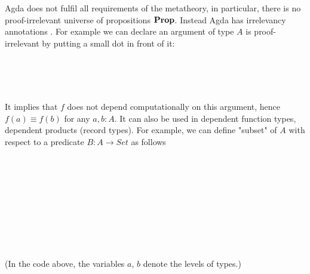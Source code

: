 Agda does not fulfil all requirements of the metatheory, in particular, there is no proof-irrelevant universe of propositions $\operatorname{\mathbf{Prop}}$. 
Instead Agda has irrelevancy annotations \cite{prAgda}. For example we can declare an argument of type $A$ is proof-irrelevant by putting a small dot in front of it: 


\begin{code}\>\<%
\\
\> \AgdaSymbol{:}   \<%
\\
\>  \AgdaSymbol{=} \<%
\\
\end{code}

It implies that $f$ does not depend computationally on this argument, hence $f(a) \equiv f(b)$ for any $a, b : A$. It can also be used in dependent function types, dependent products (record types). 
For example, we can define "subset" of $A$ with respect to a predicate $B : A \to Set$ as follows

\begin{code}\>\<%
\\
\>  \AgdaSymbol{\{} \AgdaSymbol{\}} \AgdaSymbol{(} \AgdaSymbol{:}  \AgdaSymbol{)} \<[32]%
\>[32]\<%
\\
\>[2]\<[7]%
\>[7]\AgdaSymbol{(} \AgdaSymbol{:}    \AgdaSymbol{)} \AgdaSymbol{:}  \AgdaSymbol{(}  \AgdaSymbol{)} \<%
\\
\>[0]\<[2]%
\>[2] \AgdaInductiveConstructor{\_,\_}\<%
\\
\>[0]\<[2]%
\>[2]\<%
\\
\>[2]\<[4]%
\>[4] \AgdaSymbol{:} \<%
\\
\>[2]\<[4]%
\>[4] \AgdaSymbol{:}  \<%
\\
\>  \<%
\\
\>\<\end{code}

(In the code above, the variables $a$, $b$ denote the levels of types.)

